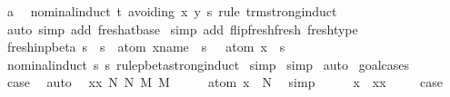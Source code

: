 \begin{isabellebody}
%
\isadelimproof
%
\endisadelimproof
%
\isatagproof
{}\isamarkupfalse%
\ a\ \isanewline
{}\isamarkupfalse%
\ {\isacharparenleft}nominal{\isacharunderscore}induct\ t\ avoiding{\isacharcolon}\ x\ y\ s\ rule{\isacharcolon}\ trm{\isachardot}strong{\isacharunderscore}induct{\isacharparenright}\isanewline
{}\isamarkupfalse%
\ {\isacharparenleft}auto\ simp\ add{\isacharcolon}\ fresh{\isacharunderscore}at{\isacharunderscore}base{\isacharparenright}\isanewline
{}\isamarkupfalse%
\ {\isacharparenleft}simp\ add{\isacharcolon}\ flip{\isacharunderscore}fresh{\isacharunderscore}fresh\ fresh{\isacharunderscore}type{\isacharparenright}%
\endisatagproof
{\isafoldproof}%
%
\isadelimproof
\isanewline
%
\endisadelimproof
\isanewline
{}\isamarkupfalse%
\ fresh{\isacharunderscore}in{\isacharunderscore}pbeta{\isacharcolon}\ {\isachardoublequoteopen}s\ {\isasymggreater}\ s{\isacharprime}\ {\isasymLongrightarrow}\ atom\ {\isacharparenleft}x{\isacharcolon}{\isacharcolon}name{\isacharparenright}\ {\isasymsharp}\ s\ {\isasymLongrightarrow}\ \ atom\ x\ {\isasymsharp}\ s{\isacharprime}{\isachardoublequoteclose}\isanewline
%
\isadelimproof
%
\endisadelimproof
%
\isatagproof
{}\isamarkupfalse%
\ {\isacharparenleft}nominal{\isacharunderscore}induct\ s\ s{\isacharprime}\ rule{\isacharcolon}pbeta{\isachardot}strong{\isacharunderscore}induct{\isacharparenright}\isanewline
{}\isamarkupfalse%
\ simp\isanewline
{}\isamarkupfalse%
\ simp\isanewline
{}\isamarkupfalse%
\ auto{\isacharbrackleft}{}{\isacharbrackright}\isanewline
{}\isamarkupfalse%
\ goal{\isacharunderscore}cases\isanewline
{}\isamarkupfalse%
\ {}\ \isamarkupfalse%
\ {\isacharquery}case\ \isamarkupfalse%
\ auto\isanewline
{}\isamarkupfalse%
\isanewline
{}\isamarkupfalse%
\ {\isacharparenleft}{}\ xx\ N\ N{\isacharprime}\ M\ M{\isacharprime}{\isacharparenright}\isanewline
\ \ \isamarkupfalse%
\ \isamarkupfalse%
\ {\isachardoublequoteopen}atom\ x\ {\isasymsharp}\ N{\isacharprime}{\isachardoublequoteclose}\ \isamarkupfalse%
\ simp\isanewline
\ \ \isacommand{{\isacharbraceleft}}\isamarkupfalse%
\ \isamarkupfalse%
\ {\isachardoublequoteopen}x\ {\isacharequal}\ xx{\isachardoublequoteclose}\ \isamarkupfalse%
\ {}\ \isamarkupfalse%
\ {\isacharquery}case\ \isamarkupfalse%

\end{isabellebody}
